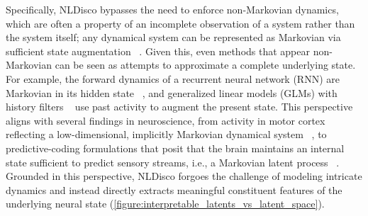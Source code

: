 Specifically, NLDisco bypasses the need to enforce non-Markovian dynamics, which are often a property of an incomplete observation of a system rather than the system itself; any dynamical system can be represented as Markovian via sufficient state augmentation ~\citep{takens_1981_embedding}. Given this, even methods that appear non-Markovian can be seen as attempts to approximate a complete underlying state. For example, the forward dynamics of a recurrent neural network (RNN) are Markovian in its hidden state ~\citep{sussillo_2013_rnn_dynamics, goodfellow_2016_rnn}, and generalized linear models (GLMs) with history filters ~\citep{pillow_2008_glms, truccolo_2005_pointprocess} use past activity to augment the present state. This perspective aligns with several findings in neuroscience, from activity in motor cortex reflecting a low-dimensional, implicitly Markovian dynamical system ~\citep{churchland_2012_population_dynamics, shenoy_2013_dynamical_perspective}, to predictive-coding formulations that posit that the brain maintains an internal state sufficient to predict sensory streams, i.e., a Markovian latent process ~\citep{rao_1999_predictive_coding, doya_2007_bayesian_brain, friston_2010_free_energy}. Grounded in this perspective, NLDisco forgoes the challenge of modeling intricate dynamics and instead directly extracts meaningful constituent features of the underlying neural state (\autoref{figure:interpretable_latents_vs_latent_space}).
